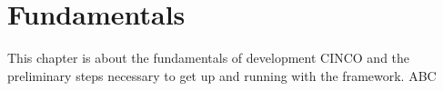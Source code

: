 
\chapter{Fundamentals}\label{ch:Basis}

This chapter is about the fundamentals of development CINCO and the preliminary steps necessary to get up and running with the framework. ABC